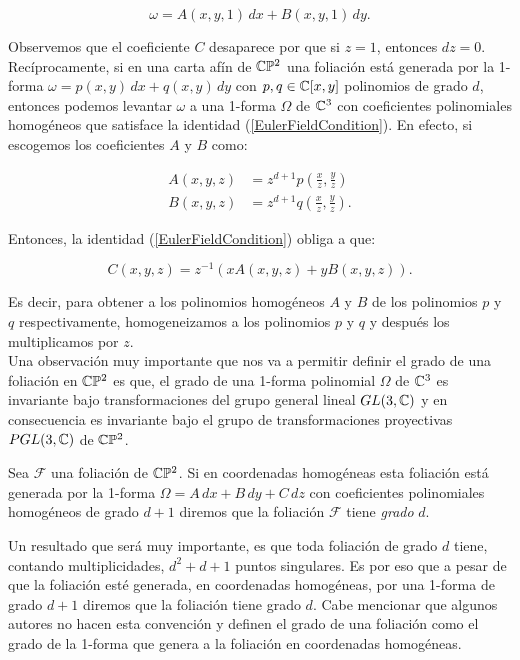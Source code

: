 \begin{equation}
\label{FormaAfin}
\omega=A(x,y,1)\, dx+B(x,y,1)\, dy.
\end{equation}

\noindent Observemos que el coeficiente $C$ desaparece por que si $z=1$, entonces $dz=0$.\\

Recíprocamente, si en una carta afín de $\mathbb{C}\mathbb{P}^{2}$ una foliación está generada por la 1-forma $\omega=p(x,y)\, dx+q(x,y)\, dy$ con $p,q\in\mathbb{C}[x,y]$ polinomios de grado $d$, entonces podemos levantar $\omega$ a una 1-forma $\Omega$ de $\mathbb{C}^{3}$ con coeficientes polinomiales homogéneos que satisface la identidad (\ref{EulerFieldCondition}). En efecto, si escogemos los coeficientes $A$ y $B$ como:

\begin{align}
A(x,y,z) &=z^{d+1}p(\tfrac{x}{z},\tfrac{y}{z})\\
B(x,y,z) &=z^{d+1}q(\tfrac{x}{z},\tfrac{y}{z}).
\end{align}

\noindent Entonces, la identidad (\ref{EulerFieldCondition}) obliga a que:

\begin{equation}
C(x,y,z) = z^{-1}(xA(x,y,z)+yB(x,y,z)).
\end{equation}

\noindent Es decir, para obtener a los polinomios homogéneos $A$ y $B$ de los polinomios $p$
y $q$ respectivamente, homogeneizamos a los polinomios $p$ y $q$ y después los multiplicamos por $z$.\\

Una observación muy importante que nos va a permitir definir el grado de una foliación en $\mathbb{C}\mathbb{P}^{2}$ es que, el grado de una 1-forma polinomial $\Omega$ de $\mathbb{C}^{3}$ es invariante bajo transformaciones del grupo general lineal $GL(3,\mathbb{C})$ y en consecuencia es invariante bajo el grupo de transformaciones proyectivas $PGL(3,\mathbb{C})$ de $\mathbb{C}\mathbb{P}^{2}$.  

\begin{defn}
\label{GradoDeUnaFoliacion}
Sea $\mathcal{F}$ una foliación de $\mathbb{C}\mathbb{P}^{2}$. Si en coordenadas homogéneas esta foliación está generada por la 1-forma $\Omega=A\, dx+B\, dy+ C\, dz$ con coeficientes polinomiales homogéneos de grado $d+1$ diremos que la foliación $\mathcal{F}$ tiene \emph{grado} $d$. 
\end{defn} 

Un resultado que será muy importante, es que toda foliación de grado $d$ tiene, contando multiplicidades, $d^{2}+d+1$ puntos singulares. Es por eso que a pesar de que la foliación esté generada, en coordenadas homogéneas, por una 1-forma de grado $d+1$ diremos que la foliación tiene grado $d$. Cabe mencionar que algunos autores no hacen esta convención y definen el grado de una foliación como el grado de la 1-forma que genera a la foliación en coordenadas homogéneas.\\

